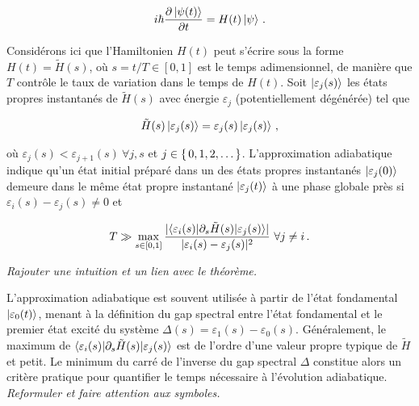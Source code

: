 
\begin{align*}
   i \hbar \frac{\partial \ket{\psi(t)}}{\partial t} = H(t) \ket{\psi} \,.
\end{align*}

Considérons ici que l'Hamiltonien $H(t)$ peut s'écrire sous la forme $H(t) = \tilde{H}(s)$, où $s=t/T \in [0,1]$ est le temps adimensionnel, de manière que $T$ contrôle le taux de variation dans le temps de $H(t)$. Soit $\ket{\varepsilon_{j} (s)}$ les états propres instantanés de $\tilde{H}(s)$ avec énergie $\varepsilon_{j}$ (potentiellement dégénérée) tel que

\begin{equation}
   \tilde{H}(s) \ket{\varepsilon_{j}(s)} = \varepsilon_{j}(s) \ket{\varepsilon_{j}(s)} \,,
\end{equation}

où $\varepsilon_{j}(s) < \varepsilon_{j+1}(s) \ \forall j,s$ et $j \in \set{ 0, 1, 2, \dots }$. L'approximation adiabatique indique qu'un état initial préparé dans un des états propres instantanés $\ket{\varepsilon_{j}(0)}$ demeure dans le même état propre instantané $\ket{\varepsilon_{j}(t)}$ à une phase globale près si $\varepsilon_{i}(s) - \varepsilon_{j}(s) \neq  0$ et

\begin{equation}
    T \gg \max_{s \in [0,1]} \frac{\lvert \braket{ \varepsilon_{i}(s) | \partial_{s} \tilde{H}(s) | \varepsilon_{j}(s) } \rvert }{\lvert \varepsilon_{i}(s) - \varepsilon_{j}(s) \rvert^{2} } \ \forall j \neq i \,.
\end{equation}



\textcolor{mydarkred}{\textit{Rajouter une intuition et un lien avec le théorème.}}

L'approximation adiabatique est souvent utilisée à partir de l'état fondamental $\ket{\varepsilon_{0}(t)}$, menant à la définition du gap spectral entre l'état fondamental et le premier état excité du système $\Delta(s) = \varepsilon_{1}(s) - \varepsilon_{0}(s)$. Généralement, le maximum de $\braket{ \varepsilon_{i}(s) | \partial_{s} \tilde{H}(s) | \varepsilon_{j}(s)}$ est de l'ordre d'une valeur propre typique de $\tilde{H}$ et petit. Le minimum du carré de l'inverse du gap spectral $\Delta$ constitue alors un critère pratique pour quantifier le temps nécessaire à l'évolution adiabatique. \textcolor{mydarkred}{\textit{Reformuler et faire attention aux symboles.}}

